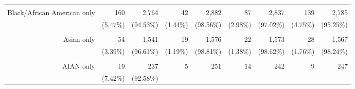 \documentclass{article}
\begin{document}
\begin{tabular}{lllllllll}
\multicolumn{1}{r}{} &
  \multicolumn{1}{|r}{} &
  \multicolumn{1}{r}{} &
  \multicolumn{1}{r}{} &
  \multicolumn{1}{r}{} &
  \multicolumn{1}{r}{} &
  \multicolumn{1}{r}{} &
  \multicolumn{1}{r}{} &
  \multicolumn{1}{r}{} \\
\multicolumn{1}{r}{Black/African American only\hspace{1em}} &
  \multicolumn{1}{|r}{160} &
  \multicolumn{1}{r}{2,764} &
  \multicolumn{1}{r}{42} &
  \multicolumn{1}{r}{2,882} &
  \multicolumn{1}{r}{87} &
  \multicolumn{1}{r}{2,837} &
  \multicolumn{1}{r}{139} &
  \multicolumn{1}{r}{2,785} \\
\multicolumn{1}{r}{} &
  \multicolumn{1}{|r}{(5.47\%)} &
  \multicolumn{1}{r}{(94.53\%)} &
  \multicolumn{1}{r}{(1.44\%)} &
  \multicolumn{1}{r}{(98.56\%)} &
  \multicolumn{1}{r}{(2.98\%)} &
  \multicolumn{1}{r}{(97.02\%)} &
  \multicolumn{1}{r}{(4.75\%)} &
  \multicolumn{1}{r}{(95.25\%)} \\
\multicolumn{1}{r}{} &
  \multicolumn{1}{|r}{} &
  \multicolumn{1}{r}{} &
  \multicolumn{1}{r}{} &
  \multicolumn{1}{r}{} &
  \multicolumn{1}{r}{} &
  \multicolumn{1}{r}{} &
  \multicolumn{1}{r}{} &
  \multicolumn{1}{r}{} \\
\multicolumn{1}{r}{Asian only\hspace{1em}} &
  \multicolumn{1}{|r}{54} &
  \multicolumn{1}{r}{1,541} &
  \multicolumn{1}{r}{19} &
  \multicolumn{1}{r}{1,576} &
  \multicolumn{1}{r}{22} &
  \multicolumn{1}{r}{1,573} &
  \multicolumn{1}{r}{28} &
  \multicolumn{1}{r}{1,567} \\
\multicolumn{1}{r}{} &
  \multicolumn{1}{|r}{(3.39\%)} &
  \multicolumn{1}{r}{(96.61\%)} &
  \multicolumn{1}{r}{(1.19\%)} &
  \multicolumn{1}{r}{(98.81\%)} &
  \multicolumn{1}{r}{(1.38\%)} &
  \multicolumn{1}{r}{(98.62\%)} &
  \multicolumn{1}{r}{(1.76\%)} &
  \multicolumn{1}{r}{(98.24\%)} \\
\multicolumn{1}{r}{} &
  \multicolumn{1}{|r}{} &
  \multicolumn{1}{r}{} &
  \multicolumn{1}{r}{} &
  \multicolumn{1}{r}{} &
  \multicolumn{1}{r}{} &
  \multicolumn{1}{r}{} &
  \multicolumn{1}{r}{} &
  \multicolumn{1}{r}{} \\
\multicolumn{1}{r}{AIAN only\hspace{1em}} &
  \multicolumn{1}{|r}{19} &
  \multicolumn{1}{r}{237} &
  \multicolumn{1}{r}{5} &
  \multicolumn{1}{r}{251} &
  \multicolumn{1}{r}{14} &
  \multicolumn{1}{r}{242} &
  \multicolumn{1}{r}{9} &
  \multicolumn{1}{r}{247} \\
\multicolumn{1}{r}{} &
  \multicolumn{1}{|r}{(7.42\%)} &
  \multicolumn{1}{r}{(92.58\%)} &

\end{tabular}
\end{document}
